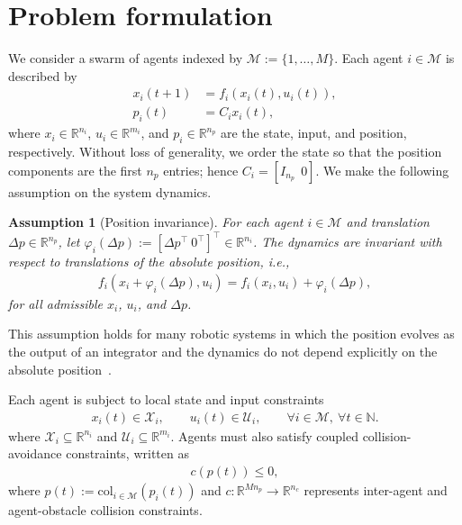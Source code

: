 \documentclass[letterpaper, 10 pt, conference]{ieeeconf}  %
\newtheorem{assumption}{Assumption}
\begin{document}
\section{Problem formulation}\label{sec:problem}

We consider a swarm of agents indexed by
$\mathcal{M}:=\{1,\ldots,M\}$. Each agent $i\in\mathcal{M}$ is described by
\begin{align}
	x_i(t+1) & = f_i(x_i(t),u_i(t)), \label{eq:agent_dyn} \\
	p_i(t)   & = C_i x_i(t), \label{eq:agent_pos}
\end{align}
where $x_i\in\mathbb{R}^{n_i}$, $u_i\in\mathbb{R}^{m_i}$, and
$p_i\in\mathbb{R}^{n_p}$ are the state, input, and position, respectively.
Without loss of generality, we order the state so that the position components
are the first $n_p$ entries; hence $C_i = [I_{n_p}\ \ 0]$.
We make the following assumption on the system dynamics.

\begin{assumption}[Position invariance]\label{ass:posinv}
	For each agent $i\in\mathcal{M}$ and translation
	$\Delta p\in\mathbb{R}^{n_p}$, let
	$\varphi_i(\Delta p):=[\Delta p^\top\ 0^\top]^\top
		\in\mathbb{R}^{n_i}$.
	The dynamics are invariant with respect to translations of the absolute
	position, i.e.,
	\begin{align}
		f_i(x_i+\varphi_i(\Delta p),u_i)
		=
		f_i(x_i,u_i)+\varphi_i(\Delta p),
		\label{eq:position_invariance}
	\end{align}
	for all admissible $x_i$, $u_i$, and $\Delta p$.
\end{assumption}

This assumption holds for many robotic systems in which the position evolves as
the output of an integrator and the dynamics do not depend explicitly on the absolute position~\cite{carron2023multi,bodmer2026anytime, saccani2023model}.

Each agent is subject to local state and input constraints
\begin{align}
	x_i(t)\in\mathcal{X}_i,\qquad
	u_i(t)\in\mathcal{U}_i,
	\qquad \forall i\in\mathcal{M},\ \forall t\in\mathbb{N}.
	\label{eq:local_constraints}
\end{align}
where $\mathcal{X}_i\subseteq\mathbb{R}^{n_i}$ and
$\mathcal{U}_i\subseteq\mathbb{R}^{m_i}$. Agents must also satisfy coupled
collision-avoidance constraints, written as
\begin{align}
	c(p(t))\leq 0,
	\label{eq:collision_constraint}
\end{align}
where $p(t):=\mathrm{col}_{i\in\mathcal{M}}(p_i(t))$ and
$c:\mathbb{R}^{Mn_p}\to\mathbb{R}^{n_c}$ represents inter-agent and
agent-obstacle collision constraints.
\end{document}
